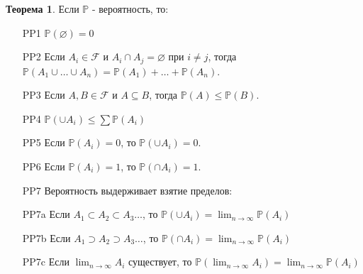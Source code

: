\documentclass[pdftex, 12pt, a4paper]{article}
\def \mbb{\mathbb}
\def \PP{\mbb{P}}
\def\F{\ensuremath{\mathcal{F}}} %
\renewcommand{\to}{\rightarrow}
\renewcommand{\le}{\leqslant}
\renewcommand{\leq}{\leqslant}
\theoremstyle{definition} %
\newtheorem{myth}{Теорема}
\numberwithin{problem}{section}
\numberwithin{blits}{section}
\begin{document}
\begin{myth} Если $\PP$ - вероятность, то:
\begin{enumerate}
\item[PP1] $\PP(\varnothing) = 0$

\item[PP2] Если $A_i \in \F$ и $A_i \cap A_j = \varnothing$ при $i \ne j$, тогда $\PP(A_1 \cup \ldots \cup A_n) = \PP(A_1) + \ldots + \PP(A_n)$.

\item[PP3]  Если $A,B \in \F$ и $A \subseteq B$, тогда $
\PP(A) \le \PP(B)$.

\item[PP4] $\PP(\cup A_{i})\leq \sum \PP(A_{i})$

\item[PP5] Если $\PP(A_{i})=0$, то $\PP(\cup A_{i})=0$.

\item[PP6] Если $\PP(A_{i})=1$, то $\PP(\cap A_{i})=1$.


\item[PP7] Вероятность выдерживает взятие пределов:

\item[PP7a] Если $A_{1}\subset A_{2}\subset A_{3} \ldots $, то $\displaystyle \PP(\cup A_{i})=\lim_{n \to \infty} \PP(A_{i})$

\item[PP7b] Если $A_{1}\supset A_{2}\supset A_{3} \ldots $, то $\displaystyle \PP(\cap A_{i})=\lim_{n \to \infty} \PP(A_{i})$

\item[PP7c] Если $\displaystyle \lim_{n \to \infty} A_{i}$ существует, то $\displaystyle \PP(\lim_{n \to \infty} A_{i})=\lim_{n \to \infty} \PP(A_{i})$
\end{enumerate}
\end{myth}
\end{document}
